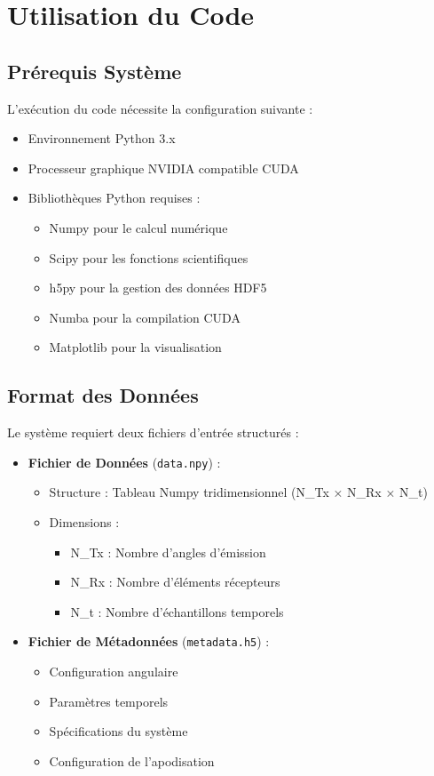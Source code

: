 \documentclass[12pt,a4paper]{article}
\begin{document}
\section{Utilisation du Code}

\subsection{Prérequis Système}
L'exécution du code nécessite la configuration suivante :
\begin{itemize}
    \item Environnement Python 3.x
    \item Processeur graphique NVIDIA compatible CUDA
    \item Bibliothèques Python requises :
    \begin{itemize}
        \item Numpy pour le calcul numérique
        \item Scipy pour les fonctions scientifiques
        \item h5py pour la gestion des données HDF5
        \item Numba pour la compilation CUDA
        \item Matplotlib pour la visualisation
    \end{itemize}
\end{itemize}

\subsection{Format des Données}
Le système requiert deux fichiers d'entrée structurés :

\begin{itemize}
    \item \textbf{Fichier de Données} (\texttt{data.npy}) :
    \begin{itemize}
        \item Structure : Tableau Numpy tridimensionnel (N\_Tx × N\_Rx × N\_t)
        \item Dimensions : 
        \begin{itemize}
            \item N\_Tx : Nombre d'angles d'émission
            \item N\_Rx : Nombre d'éléments récepteurs
            \item N\_t : Nombre d'échantillons temporels
        \end{itemize}
    \end{itemize}
    
    \item \textbf{Fichier de Métadonnées} (\texttt{metadata.h5}) :
    \begin{itemize}
        \item Configuration angulaire
        \item Paramètres temporels
        \item Spécifications du système
        \item Configuration de l'apodisation
    \end{itemize}
\end{itemize}
\end{document}
